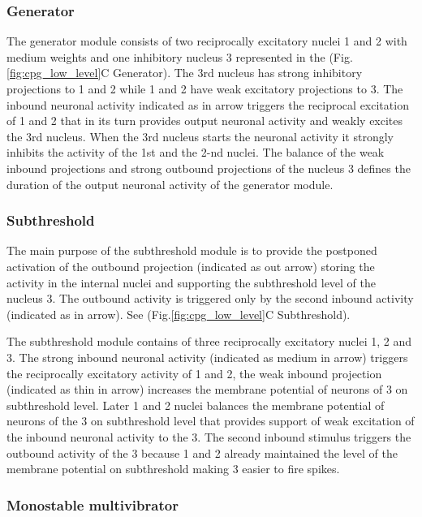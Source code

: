 \documentclass[]{elsarticle}
\begin{document}
\subsubsection{Generator}\label{sec:generator}

The generator module consists of two reciprocally excitatory nuclei 1 and 2 with medium weights and one inhibitory nucleus 3 represented in the (Fig.\ref{fig:cpg_low_level}C Generator).
The 3rd nucleus has strong inhibitory projections to 1 and 2 while 1 and 2 have weak excitatory projections to 3.
The inbound neuronal activity indicated as in arrow triggers the reciprocal excitation of 1 and 2 that in its turn provides output neuronal activity and weakly excites the 3rd nucleus.
When the 3rd nucleus starts the neuronal activity it strongly inhibits the activity of the 1st and the 2-nd nuclei.
The balance of the weak inbound projections and strong outbound projections of the nucleus 3 defines the duration of the output neuronal activity of the generator module.

\subsubsection{Subthreshold}\label{sec:subthreshold}

The main purpose of the subthreshold module is to provide the postponed activation of the outbound projection (indicated as out arrow) storing the activity in the internal nuclei and supporting the subthreshold level of the nucleus 3. The outbound activity is triggered only by the second inbound activity (indicated as in arrow). See (Fig.\ref{fig:cpg_low_level}C Subthreshold).

The subthreshold module contains of three reciprocally excitatory nuclei 1, 2 and 3. The strong inbound neuronal activity (indicated as medium in arrow) triggers the reciprocally excitatory activity of 1 and 2, the weak inbound projection (indicated as thin in arrow) increases the membrane potential of neurons of 3 on subthreshold level.
Later 1 and 2 nuclei balances the membrane potential of neurons of the 3 on subthreshold level that provides support of weak excitation of the inbound neuronal activity to the 3. The second inbound stimulus triggers the outbound activity of the 3 because 1 and 2 already maintained the level of the membrane potential on subthreshold making 3 easier to fire spikes.

\subsubsection{Monostable multivibrator}\label{sec:monovibrator}
\end{document}
